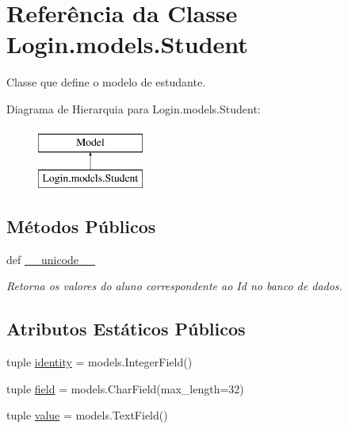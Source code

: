 \hypertarget{classLogin_1_1models_1_1Student}{\section{Referência da Classe Login.\-models.\-Student}
\label{d9/d70/classLogin_1_1models_1_1Student}
}


Classe que define o modelo de estudante.  


Diagrama de Hierarquia para Login.\-models.\-Student\-:\begin{figure}[H]
\begin{center}
\leavevmode
\includegraphics[height=2.000000cm]{d9/d70/classLogin_1_1models_1_1Student}
\end{center}
\end{figure}
\subsection*{Métodos Públicos}
\begin{DoxyCompactItemize}
\item 
def \hyperlink{classLogin_1_1models_1_1Student_a68830e952b3f0888ba05cbb7d3f05f68}{\-\_\-\-\_\-unicode\-\_\-\-\_\-}
\begin{DoxyCompactList}\small\item\em Retorna os valores do aluno correspondente ao Id no banco de dados. \end{DoxyCompactList}\end{DoxyCompactItemize}
\subsection*{Atributos Estáticos Públicos}
\begin{DoxyCompactItemize}
\item 
tuple \hyperlink{classLogin_1_1models_1_1Student_a1e24367791c8f045c32b0694c55a553f}{identity} = models.\-Integer\-Field()
\item 
tuple \hyperlink{classLogin_1_1models_1_1Student_a85f47825471508e73b87763b312ee774}{field} = models.\-Char\-Field(max\-\_\-length=32)
\item 
tuple \hyperlink{classLogin_1_1models_1_1Student_ac98a87f107f696743b68fcc82dc87980}{value} = models.\-Text\-Field()
\end{DoxyCompactItemize}


